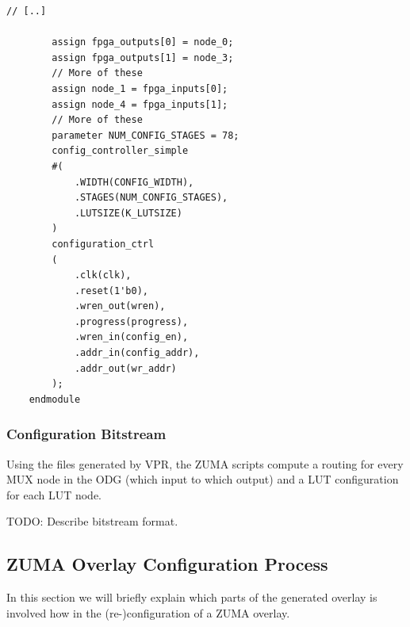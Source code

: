 \documentclass{article}
\begin{document}
\begin{lstlisting}[style=Verilog,caption={{Example Verilog excerpt from ZUMA\_custom\_generated.v.}}, label={lst:verilog_ZUMA_custom_generated.v}]
        // [..]

        assign fpga_outputs[0] = node_0;
        assign fpga_outputs[1] = node_3;
        // More of these
        assign node_1 = fpga_inputs[0];
        assign node_4 = fpga_inputs[1];
        // More of these
        parameter NUM_CONFIG_STAGES = 78;
        config_controller_simple
        #(
            .WIDTH(CONFIG_WIDTH),
            .STAGES(NUM_CONFIG_STAGES),
            .LUTSIZE(K_LUTSIZE)
        )
        configuration_ctrl
        (
            .clk(clk),
            .reset(1'b0),
            .wren_out(wren),
            .progress(progress),
            .wren_in(config_en),
            .addr_in(config_addr),
            .addr_out(wr_addr)
        );
    endmodule

\end{lstlisting}

\subsubsection{Configuration Bitstream}
Using the files generated by VPR, the ZUMA scripts compute a routing for every MUX node in the ODG (which input to which output) and a LUT configuration for each LUT node.

TODO: Describe bitstream format.

\subsection{ZUMA Overlay Configuration Process}
In this section we will briefly explain which parts of the generated overlay is involved how in the (re-)configuration of a ZUMA overlay.
\end{document}
